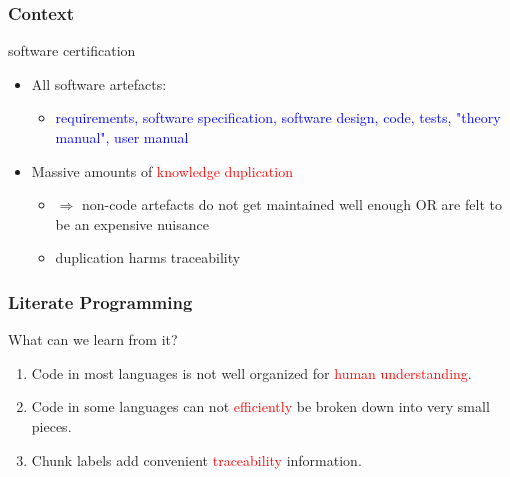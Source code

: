 \documentclass{beamer}
\begin{document}
\begin{frame}
\frametitle{Context}
{\Large software certification}
\vspace*{.2cm}
\begin{itemize}
\item<3->All software artefacts:
\begin{itemize}
\item \textcolor{blue}{requirements, software specification, software design, code, 
  tests, "theory manual", user manual}
\end{itemize}
\vspace*{.5cm}
\item<4->Massive amounts of \textcolor{red}{knowledge duplication}
\begin{itemize}
  \item $\Rightarrow$
       non-code artefacts do not get maintained well enough
          OR are felt to be an expensive nuisance
  \item duplication harms traceability
\end{itemize}
\end{itemize}
\vfill
\end{frame}

\begin{frame}
\frametitle{Literate Programming}
What can we learn from it?
\begin{enumerate}
\item<2-> Code in most languages is not well organized for 
  \textcolor{red}{human understanding}.
\item<3-> Code in some languages can not \textcolor{red}{efficiently} be broken 
down into very small pieces.
\item<4-> Chunk labels add convenient \textcolor{red}{traceability} information.
\end{enumerate}
\end{frame}

\end{document}
